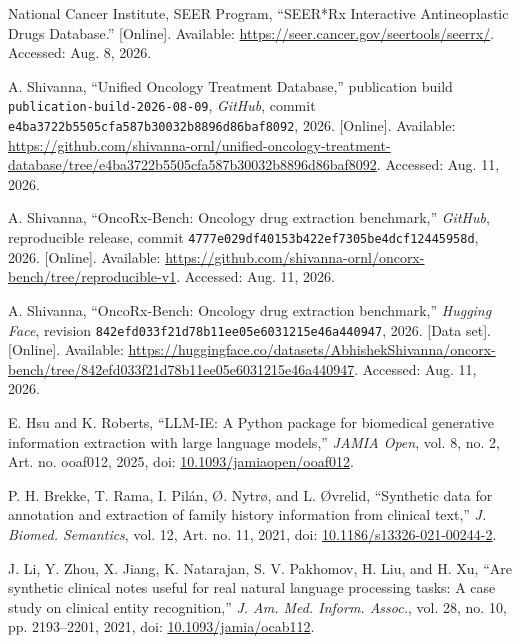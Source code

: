 \documentclass[conference]{IEEEtran}
\newif\ifanonymous
\newcommand{\code}[1]{\texttt{#1}}
\begin{document}
\begin{thebibliography}{99}
National Cancer Institute, SEER Program, ``SEER*Rx Interactive Antineoplastic
Drugs Database.'' [Online]. Available:
\url{https://seer.cancer.gov/seertools/seerrx/}. Accessed: Aug. 8, 2026.

\ifanonymous
Anonymous, ``Knowledge-base artifact,'' omitted for double-anonymous review,
2026.
\else
A. Shivanna, ``Unified Oncology Treatment Database,'' publication build
\code{publication-build-2026-08-09}, \emph{GitHub}, commit
\code{e4ba3722b5505cfa587b30032b8896d86baf8092}, 2026. [Online]. Available:
\url{https://github.com/shivanna-ornl/unified-oncology-treatment-database/tree/e4ba3722b5505cfa587b30032b8896d86baf8092}.
Accessed: Aug. 11, 2026.
\fi

\ifanonymous
Anonymous, ``Source-code artifact,'' omitted for double-anonymous review, 2026.
\else
A. Shivanna, ``OncoRx-Bench: Oncology drug extraction benchmark,''
\emph{GitHub}, reproducible release, commit
\code{4777e029df40153b422ef7305be4dcf12445958d}, 2026. [Online]. Available:
\url{https://github.com/shivanna-ornl/oncorx-bench/tree/reproducible-v1}.
Accessed: Aug. 11, 2026.
\fi

\ifanonymous
Anonymous, ``Dataset artifact,'' omitted for double-anonymous review, 2026.
\else
A. Shivanna, ``OncoRx-Bench: Oncology drug extraction benchmark,''
\emph{Hugging Face}, revision
\code{842efd033f21d78b11ee05e6031215e46a440947}, 2026. [Data set].
[Online]. Available:
\url{https://huggingface.co/datasets/AbhishekShivanna/oncorx-bench/tree/842efd033f21d78b11ee05e6031215e46a440947}.
Accessed: Aug. 11, 2026.
\fi

E. Hsu and K. Roberts, ``LLM-IE: A Python package for biomedical generative
information extraction with large language models,'' \emph{JAMIA Open}, vol. 8,
no. 2, Art. no. ooaf012, 2025, doi:
\href{https://doi.org/10.1093/jamiaopen/ooaf012}{10.1093/jamiaopen/ooaf012}.

P. H. Brekke, T. Rama, I. Pil\'an, {\O}. Nytr{\o}, and L. {\O}vrelid, ``Synthetic
data for annotation and extraction of family history information from clinical
text,'' \emph{J. Biomed. Semantics}, vol. 12, Art. no. 11, 2021, doi:
\href{https://doi.org/10.1186/s13326-021-00244-2}{10.1186/s13326-021-00244-2}.

J. Li, Y. Zhou, X. Jiang, K. Natarajan, S. V. Pakhomov, H. Liu, and H. Xu,
``Are synthetic clinical notes useful for real natural language processing
tasks: A case study on clinical entity recognition,'' \emph{J. Am. Med.
Inform. Assoc.}, vol. 28, no. 10, pp. 2193--2201, 2021, doi:
\href{https://doi.org/10.1093/jamia/ocab112}{10.1093/jamia/ocab112}.


\end{thebibliography}
\end{document}

